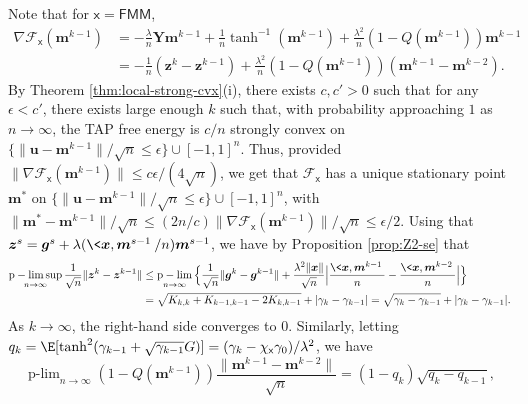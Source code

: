 \documentclass[]{article}
\def\sx{{\mathsf x}}
\def\bx{{\boldsymbol x}}
\def\cF{{\mathcal F}}
\def\bz{{\boldsymbol z}}
\def\bu{{\boldsymbol u}}
\def\bg{{\boldsymbol g}}
\def\bx{{\boldsymbol x}}
\def\cF{{\mathcal F}}
\def\bz{{\boldsymbol z}}
\def\bu{{\boldsymbol u}}
\def\bg{{\boldsymbol g}}
\def\bY{{\boldsymbol Y}}
\def\bbm{{\boldsymbol m}}
\DeclareMathOperator*{\plim}{p-lim}
\DeclareMathOperator*{\plimsup}{p-lim\,sup}
\def\FMM{\mathsf{FMM}}
\begin{document}
Note that for $\sx = \FMM$,
\begin{equation}
\begin{aligned}
    \nabla \cF_{\sx}(\bbm^{k-1})
        &=
        -\frac{\lambda}{n}\bY \bbm^{k-1} + \frac1n \tanh^{-1}(\bbm^{k-1})
        +\frac{\lambda^2}{n}(1 - Q(\bbm^{k-1}))\bbm^{k-1}
    \\
        &=
        -\frac1n(\bz^k - \bz^{k-1})
        + \frac{\lambda^2}{n}(1-Q(\bbm^{k-1}))(\bbm^{k-1} - \bbm^{k-2}).
\end{aligned}
\end{equation}
By Theorem \ref{thm:local-strong-cvx}(i),
there exists $c,c' > 0$ such that for any $\epsilon < c'$, there exists large enough $k$ such that, with probability approaching $1$ as $n \rightarrow \infty$,
the TAP free energy is $c/n$ strongly convex on $\{ \| \bu - \bbm^{k-1} \| / \sqrt{n} \leq \epsilon \} \cup [-1,1]^n$.
Thus, provided $\| \nabla \cF_{\sx}(\bbm^{k-1}) \| \leq c\epsilon/(4\sqrt{n}) $,
we get that $\cF_{\sx}$ has a unique stationary point $\bbm^*$ on $\{ \| \bu - \bbm^{k-1} \| / \sqrt{n} \leq \epsilon \} \cup [-1,1]^n$,
with $\| \bbm^* - \bbm^{k-1} \|/\sqrt{n} \leq (2n/c) \| \nabla \cF_{\sx}(\bbm^{k-1}) \| / \sqrt{n} \leq \epsilon / 2$.
Using that $\bz^s = \bg^s + \lambda (\< \bx , \bbm^{s-1} \> /n) \bbm^{s-1}$,
we have by Proposition \ref{prop:Z2-se} that
\begin{equation}
\begin{aligned}
    \plimsup_{n \rightarrow \infty} \frac1{\sqrt{n}} \| \bz^k - \bz^{k-1} \|
        &\leq
        \plim_{n\rightarrow \infty}
        \Big\{
            \frac1{\sqrt{n}} \| \bg^k - \bg^{k-1} \| 
            + 
            \frac{\lambda^2\|\bx\|}{\sqrt{n}} 
            \Big|
                \frac{\< \bx , \bbm^{k-1}\>}n
                -
                \frac{\< \bx , \bbm^{k-2}\>}n
            \Big|
        \Big\}
    \\
        &= 
        \sqrt{K_{k,k} + K_{k-1,k-1} - 2 K_{k,k-1}}
        + 
        |\gamma_k - \gamma_{k-1}|
        =
        \sqrt{\gamma_k - \gamma_{k-1}}
        +
        |\gamma_k - \gamma_{k-1}|.
\end{aligned}
\end{equation}
As $k \rightarrow \infty$, the right-hand side converges to 0.
Similarly, letting $q_k = \E[\tanh^2(\gamma_{k-1} + \sqrt{\gamma_{k-1}}G)] = (\gamma_k - \chi_{\sx}\gamma_0)/\lambda^2$,
we have
\begin{equation}
    \plim_{n \rightarrow \infty}(1-Q(\bbm^{k-1}))\frac{\|\bbm^{k-1} - \bbm^{k-2} \|}{\sqrt{n}}
        = 
        (1-q_k) \sqrt{q_k - q_{k-1}},
\end{equation}
\end{document}
